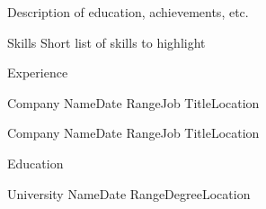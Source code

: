 \documentclass{resume}
\begin{document}
\begin{rSection}{}
  Description of education, achievements, etc.
\end{rSection}

\begin{rSection}{Skills}
  Short list of skills to highlight
\end{rSection}

\begin{rSection}{Experience}

  \begin{rSubsection}{Company Name}{Date Range}{Job Title}{Location}
  \end{rSubsection}

  \begin{rSubsection}{Company Name}{Date Range}{Job Title}{Location}
  \end{rSubsection}

\end{rSection}

\begin{rSection}{Education}
  \begin{rSubsection}{University Name}{Date Range}{Degree}{Location}
  \end{rSubsection}
\end{rSection}
\end{document}
